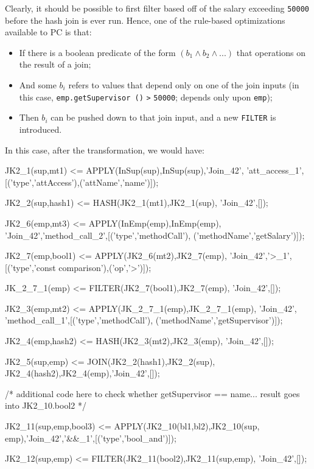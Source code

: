Clearly, it should be possible to first filter based off of the salary exceeding \texttt{50000} before the hash join is ever run.  Hence, one of
the rule-based optimizations available to PC is that:

\begin{itemize}

\item If there is a boolean predicate of the form $(b_1 \wedge b_2 \wedge ...)$ that operations
on the result of a join;

\item And some $b_i$ refers to values that depend only on one of the join inputs (in this case, \texttt{emp.getSupervisor ()}
\texttt{>} \texttt{50000};
depends only upon \texttt{emp});

\item Then $b_i$ can be pushed down to that join input, and a new
  \texttt{FILTER} is introduced.
\end{itemize}

\noindent In this case, after the transformation, we would have:

\begin{codesmall}
JK2_1(sup,mt1) <= APPLY(InSup(sup),InSup(sup),'Join_42',
'att_access_1',[('type','attAccess'),('attName','name')]);

JK2_2(sup,hash1) <= HASH(JK2_1(mt1),JK2_1(sup),
'Join_42',[]);

JK2_6(emp,mt3) <= APPLY(InEmp(emp),InEmp(emp),
'Join_42','method_call_2',[('type','methodCall'),
('methodName','getSalary')]);

JK2_7(emp,bool1) <= APPLY(JK2_6(mt2),JK2_7(emp),
'Join_42','>_1',[('type','const comparison'),('op','>')]);

JK_2_7_1(emp) <= FILTER(JK2_7(bool1),JK2_7(emp),
'Join_42',[]);

JK2_3(emp,mt2) <= APPLY(JK_2_7_1(emp),JK_2_7_1(emp),
'Join_42', 'method_call_1',[('type','methodCall'),
('methodName','getSupervisor')]);

JK2_4(emp,hash2) <= HASH(JK2_3(mt2),JK2_3(emp),
'Join_42',[]);

JK2_5(sup,emp) <= JOIN(JK2_2(hash1),JK2_2(sup),
JK2_4(hash2),JK2_4(emp),'Join_42',[]);

/* additional code here to check whether getSupervisor 
== name... result goes into JK2_10.bool2 */

JK2_11(sup,emp,bool3) <= APPLY(JK2_10(bl1,bl2),JK2_10(sup,
emp),'Join_42','&&_1',[('type','bool_and')]);

JK2_12(sup,emp) <= FILTER(JK2_11(bool2),JK2_11(sup,emp),
'Join_42',[]);
\end{codesmall}
